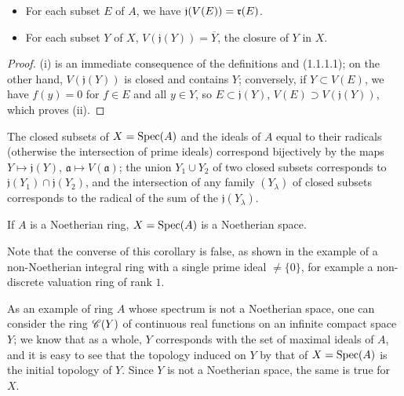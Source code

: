 \begin{prop}[1.1.4]
\label{1.1.1.4}
\medskip\noindent
\begin{itemize}
  \item[{\rm(i)}] For each subset $E$ of $A$, we have $\mathfrak{j}(V(E))=\mathfrak{r}(E)$.
  \item[{\rm(ii)}] For each subset $Y$ of $X$, $V(\mathfrak{j}(Y))=\overline{Y}$, the closure
    of $Y$ in $X$.
\end{itemize}
\end{prop}

\begin{proof}
\label{proof-1.1.1.4}
(i) is an immediate consequence of the definitions and (1.1.1.1); on the other hand,
$V(\mathfrak{j}(Y))$ is closed and contains $Y$; conversely, if $Y\subset V(E)$, we have
$f(y)=0$ for $f\in E$ and all $y\in Y$, so $E\subset\mathfrak{j}(Y)$,
$V(E)\supset V(\mathfrak{j}(Y))$, which proves (ii).
\end{proof}

\begin{cor}[1.1.5]
\label{1.1.1.5}
The closed subsets of $X={\mathop{\mathrm{Spec}}\nolimits}(A)$ and the ideals of $A$ equal to their radicals (otherwise
the intersection of prime ideals) correspond bijectively by the  maps
$Y\mapsto\mathfrak{j}(Y)$, $\mathfrak{a}\mapsto V(\mathfrak{a})$; the union $Y_1\cup Y_2$ of
two closed subsets corresponds to $\mathfrak{j}(Y_1)\cap\mathfrak{j}(Y_2)$, and the
intersection of any family $(Y_\lambda)$ of closed subsets corresponds to the radical of the
sum of the $\mathfrak{j}(Y_\lambda)$.
\end{cor}

\begin{cor}[1.1.6]
\label{1.1.1.6}
If $A$ is a Noetherian ring, $X={\mathop{\mathrm{Spec}}\nolimits}(A)$ is a Noetherian space.
\end{cor}

Note that the converse of this corollary is false, as shown
in the example of a non-Noetherian integral ring with a single prime ideal $\neq\{0\}$, for
example a non-discrete valuation ring of rank $1$.

As an example of ring $A$ whose spectrum is not a Noetherian space, one can consider the ring
$\mathscr{C}(Y)$ of continuous real functions on an infinite compact space $Y$; we know that as a
whole, $Y$ corresponds with the set of maximal ideals of $A$, and it is easy to see that the
topology induced on $Y$ by that of $X={\mathop{\mathrm{Spec}}\nolimits}(A)$ is the initial topology of $Y$. Since $Y$ is
not a Noetherian space, the same is true for $X$.

